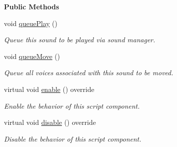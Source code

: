 \begin{Indent}\textbf{ Public Methods}\par
\begin{DoxyCompactItemize}
\item 
\mbox{\label{classrev_1_1_audio_source_component_ae1e1070cc6c81a63e7296d643712ae58}} 
void \mbox{\hyperlink{classrev_1_1_audio_source_component_ae1e1070cc6c81a63e7296d643712ae58}{queue\+Play}} ()
\begin{DoxyCompactList}\small\item\em Queue this sound to be played via sound manager. \end{DoxyCompactList}\item 
\mbox{\label{classrev_1_1_audio_source_component_a7916310834cbb392f9cec1b827f1cfcd}} 
void \mbox{\hyperlink{classrev_1_1_audio_source_component_a7916310834cbb392f9cec1b827f1cfcd}{queue\+Move}} ()
\begin{DoxyCompactList}\small\item\em Queue all voices associated with this sound to be moved. \end{DoxyCompactList}\item 
\mbox{\label{classrev_1_1_audio_source_component_a589284b330ef591ba5d99bd4308b0887}} 
virtual void \mbox{\hyperlink{classrev_1_1_audio_source_component_a589284b330ef591ba5d99bd4308b0887}{enable}} () override
\begin{DoxyCompactList}\small\item\em Enable the behavior of this script component. \end{DoxyCompactList}\item 
\mbox{\label{classrev_1_1_audio_source_component_a529ec2ffc8e033d871bd8ba7441a4f12}} 
virtual void \mbox{\hyperlink{classrev_1_1_audio_source_component_a529ec2ffc8e033d871bd8ba7441a4f12}{disable}} () override
\begin{DoxyCompactList}\small\item\em Disable the behavior of this script component. \end{DoxyCompactList}\item 
\mbox{\label{classrev_1_1_audio_source_component_ab2de22f97f0aa65fe43d125c3be91117}} 

\end{DoxyCompactItemize}
\end{Indent}
